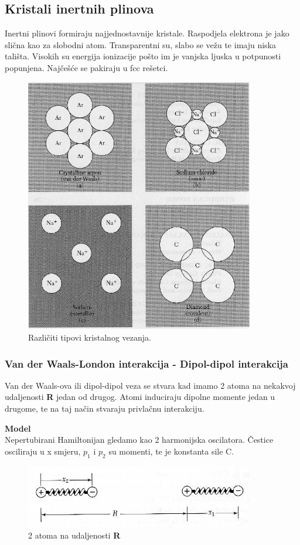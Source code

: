 \documentclass{article}
\numberwithin{equation}{section}
\begin{document}
\subsection{Kristali inertnih plinova}
Inertni plinovi formiraju najjednostavnije kristale. Raspodjela elektrona je jako slična kao za slobodni atom. Transparentni su, slabo se vežu te imaju niska tališta. Visokih su energija ionizacije pošto im je vanjska ljuska u potpunosti popunjena. Najčešće se pakiraju u fcc rešetci. 
\begin{figure}[h!]
    \centering
    \includegraphics[width=10cm]{KristVeze1.png}
    \caption{Različiti tipovi kristalnog vezanja.}
    \label{fig:KristVeze1}
\end{figure}
\newpage
\subsubsection{Van der Waals-London interakcija - Dipol-dipol interakcija}
Van der Waals-ova ili dipol-dipol veza se stvara kad imamo 2 atoma na nekakvoj udaljenosti \textbf{R} jedan od drugog. Atomi induciraju dipolne momente jedan u drugome, te na taj način stvaraju privlačnu interakciju. 

\textbf{Model}\\ Nepertubirani Hamiltonijan gledamo kao 2 harmonijska oscilatora. Čestice osciliraju u x smjeru, $p_1$ i $p_2$ su momenti, te je konstanta sile C.
\begin{figure}[h!]
    \centering
    \includegraphics[width=10cm]{KristVeze2.png}
    \caption{2 atoma na udaljenosti \textbf{R}}
    \label{fig:KristVeze2}
\end{figure}
\end{document}
